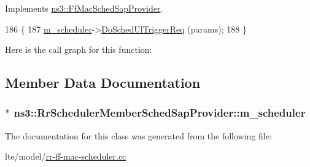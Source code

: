 Implements \hyperlink{classns3_1_1FfMacSchedSapProvider_a7bd978ea17a587a1626ef684be006c04}{ns3\+::\+Ff\+Mac\+Sched\+Sap\+Provider}.


\begin{DoxyCode}
186 \{
187   \hyperlink{classns3_1_1RrSchedulerMemberSchedSapProvider_a211b1204f0f0da93ca011ee177ac0a65}{m\_scheduler}->\hyperlink{classns3_1_1RrFfMacScheduler_aa10f6f7a60107f3325456813cbba3a99}{DoSchedUlTriggerReq} (params);
188 \}
\end{DoxyCode}


Here is the call graph for this function\+:




\subsection{Member Data Documentation}
\subsubsection[{\texorpdfstring{m\+\_\+scheduler}{m_scheduler}}]{ $\ast$ ns3\+::\+Rr\+Scheduler\+Member\+Sched\+Sap\+Provider\+::m\+\_\+scheduler\hspace{0.3cm}{\ttfamily [private]}}\hypertarget{classns3_1_1RrSchedulerMemberSchedSapProvider_a211b1204f0f0da93ca011ee177ac0a65}{}\label{classns3_1_1RrSchedulerMemberSchedSapProvider_a211b1204f0f0da93ca011ee177ac0a65}


The documentation for this class was generated from the following file\+:\begin{DoxyCompactItemize}
\item 
lte/model/\hyperlink{lte_2model_2rr-ff-mac-scheduler_8cc}{rr-\/ff-\/mac-\/scheduler.\+cc}\end{DoxyCompactItemize}
